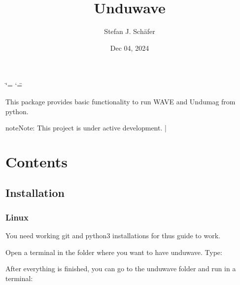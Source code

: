 \documentclass[letterpaper,10pt,english]{sphinxmanual}
\title{Unduwave}
\date{Dec 04, 2024}
\author{Stefan J.\@{} Schäfer}
\begin{document}
\ifdefined\shorthandoff
  \ifnum\catcode`\=\string=\active\shorthandoff{=}\fi
  \ifnum\catcode`\"=\active{}\fi
\fi

\pagestyle{empty}
\sphinxmaketitle
\pagestyle{plain}
\sphinxtableofcontents
\pagestyle{normal}
\label{\detokenize{index::doc}}\begin{quote}
\end{quote}



\sphinxAtStartPar
This package provides basic functionality to run WAVE and Undumag from python.

\begin{sphinxadmonition}{note}{Note:}
\sphinxAtStartPar
This project is under active development. |
\end{sphinxadmonition}


\chapter{Contents}
\label{\detokenize{index:contents}}
\sphinxstepscope


\section{Installation}
\label{\detokenize{installation:installation}}\label{\detokenize{installation::doc}}

\subsection{Linux}
\label{\detokenize{installation:linux}}
\begin{DUlineblock}{0em}
\item[] You need working git and python3 installations for thus guide to work.
\end{DUlineblock}

\sphinxAtStartPar
Open a terminal in the folder where you want to have unduwave. Type:

\begin{sphinxVerbatim}[commandchars=\\\{\}]
\end{sphinxVerbatim}

\sphinxAtStartPar
After everything is finished, you can go to the unduwave folder and run in a terminal:

\begin{sphinxVerbatim}[commandchars=\\\{\}]
\end{sphinxVerbatim}
\end{document}
